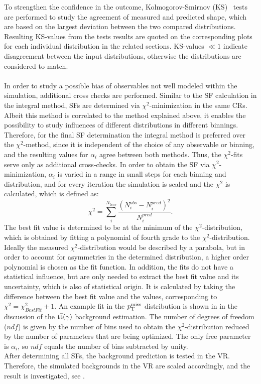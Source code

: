 To strengthen the confidence in the outcome, Kolmogorov-Smirnov (KS)~\cite{KS} tests are performed to study the agreement of measured and predicted shape, which are based on the largest deviation between the two compared distributions. Resulting KS-values from the tests results are quoted on the corresponding plots for each individual distribution in the related sections. KS-values $\ll1$ indicate disagreement between the input distributions, otherwise the distributions are considered to match.\\\\
In order to study a possible bias of observables not well modeled within the simulation, additional cross checks are performed. Similar to the SF calculation in the integral method, SFs are determined via $\chi^2$-minimization in the same CRs. Albeit this method is correlated to the method explained above, it enables the possibility to study influences of different distributions in different binnings. Therefore, for the final SF determination the integral method is preferred over the $\chi^2$-method, since it is independent of the choice of any observable or binning, and the resulting values for $\alpha_i$ agree between both methods. Thus, the $\chi^2$-fits serve only as additional cross-checks. In order to obtain the SF via $\chi^2$-minimization, $\alpha_{i}$ is varied in a range in small steps for each binning and distribution, and for every iteration the simulation is scaled and the $\chi^2$ is calculated, which is defined as:
\begin{equation}
 \chi^2=\sum_i^{N_{bins}} \frac{\left(N_{i}^{obs}-N_{i}^{pred}\right)^2}{N_{i}^{pred}}.
\end{equation}
The best fit value is determined to be at the minimum of the $\chi^2$-distribution, which is obtained by fitting a polynomial of fourth grade to the $\chi^2$-distribution. Ideally the measured $\chi^2$-distribution would be described by a parabola, but in order to account for asymmetries in the determined distribution, a higher order polynomial is chosen as the fit function. In addition, the fits do not have a statistical influence, but are only needed to extract the best fit value and its uncertainty, which is also of statistical origin. It is calculated by taking the difference between the best fit value and the values, corresponding to $\chi^2=\chi^2_{BestFit}+1$. An example fit in the $p_{\mathrm{T}}^\text{miss}$ distribution is shown in  in the discussion of the ${\mathrm{t}\overline{\mathrm{t}}}(\gamma)$ background estimation. The number of degrees of freedom ($ndf$) is given by the number of bins used to obtain the $\chi^2$-distribution reduced by the number of parameters that are being optimized. The only free parameter is $\alpha_{i}$, so $ndf$ equals the number of bins subtracted by unity.\\
After determining all SFs, the background prediction is tested in the VR. Therefore, the simulated backgrounds in the VR are scaled accordingly, and the result is investigated, see .



